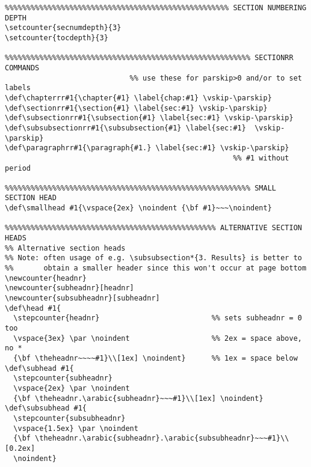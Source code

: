 {\begin{verbatim}
%%%%%%%%%%%%%%%%%%%%%%%%%%%%%%%%%%%%%%%%%%%%%%%%%%%% SECTION NUMBERING DEPTH
\setcounter{secnumdepth}{3}
\setcounter{tocdepth}{3}

%%%%%%%%%%%%%%%%%%%%%%%%%%%%%%%%%%%%%%%%%%%%%%%%%%%%%%%%% SECTIONRR COMMANDS
                             %% use these for parskip>0 and/or to set labels
\def\chapterrr#1{\chapter{#1} \label{chap:#1} \vskip-\parskip}  
\def\sectionrr#1{\section{#1} \label{sec:#1} \vskip-\parskip}
\def\subsectionrr#1{\subsection{#1} \label{sec:#1} \vskip-\parskip}
\def\subsubsectionrr#1{\subsubsection{#1} \label{sec:#1}  \vskip-\parskip}
\def\paragraphrr#1{\paragraph{#1.} \label{sec:#1} \vskip-\parskip}
                                                     %% #1 without period

%%%%%%%%%%%%%%%%%%%%%%%%%%%%%%%%%%%%%%%%%%%%%%%%%%%%%%%%% SMALL SECTION HEAD 
\def\smallhead #1{\vspace{2ex} \noindent {\bf #1}~~~\noindent} 

%%%%%%%%%%%%%%%%%%%%%%%%%%%%%%%%%%%%%%%%%%%%%%%%% ALTERNATIVE SECTION HEADS
%% Alternative section heads
%% Note: often usage of e.g. \subsubsection*{3. Results} is better to
%%       obtain a smaller header since this won't occur at page bottom
\newcounter{headnr}            
\newcounter{subheadnr}[headnr]
\newcounter{subsubheadnr}[subheadnr]
\def\head #1{
  \stepcounter{headnr}                          %% sets subheadnr = 0 too 
  \vspace{3ex} \par \noindent                   %% 2ex = space above, no *
  {\bf \theheadnr~~~~#1}\\[1ex] \noindent}      %% 1ex = space below
\def\subhead #1{  
  \stepcounter{subheadnr}
  \vspace{2ex} \par \noindent
  {\bf \theheadnr.\arabic{subheadnr}~~~#1}\\[1ex] \noindent}
\def\subsubhead #1{
  \stepcounter{subsubheadnr}
  \vspace{1.5ex} \par \noindent
  {\bf \theheadnr.\arabic{subheadnr}.\arabic{subsubheadnr}~~~#1}\\[0.2ex] 
  \noindent}


\end{verbatim}}
